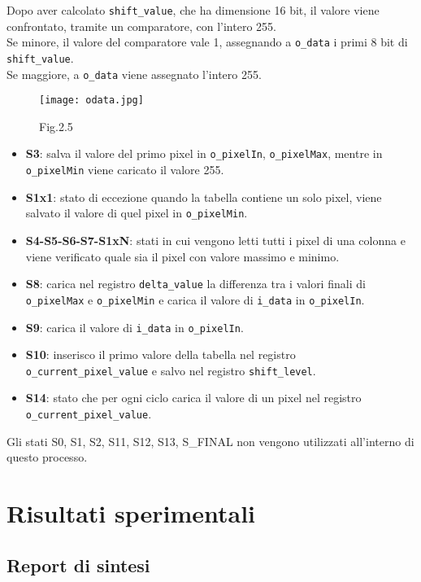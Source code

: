 \documentclass[12pt, table, xcdraw]{article}
\begin{document}
Dopo aver calcolato \texttt{shift\_value}, che ha dimensione 16 bit, il valore viene confrontato, tramite un comparatore, con l'intero 255. \\
Se minore, il valore del comparatore vale 1, assegnando a \texttt{o\_data} i primi 8 bit di \texttt{shift\_value}.\\
Se maggiore, a \texttt{o\_data} viene assegnato l'intero 255. \\

\begin{figure}[h!]
\begin{center}
  \texttt{[image: odata.jpg]}
  \caption*{Fig.2.5}
\end{center}
\end{figure}
\FloatBarrier

\begin{itemize}
\item \textbf{S3}: salva il valore del primo pixel in \texttt{o\_pixelIn}, \texttt{o\_pixelMax}, mentre in \texttt{o\_pixelMin} viene caricato il valore 255.
\item \textbf{S1x1}: stato di eccezione quando la tabella contiene un solo pixel, viene salvato il valore di quel pixel in \texttt{o\_pixelMin}.
\item \textbf{S4-S5-S6-S7-S1xN}: stati in cui vengono letti tutti i pixel di una colonna e viene verificato quale sia il pixel con valore massimo e minimo.
\item \textbf{S8}: carica nel registro \texttt{delta\_value} la differenza tra i valori finali di \texttt{o\_pixelMax} e \texttt{o\_pixelMin} e carica il valore di \texttt{i\_data} in \texttt{o\_pixelIn}.
\item \textbf{S9}: carica il valore di \texttt{i\_data} in \texttt{o\_pixelIn}.
\item \textbf{S10}: inserisco il primo valore della tabella nel registro \texttt{o\_current\_pixel\_value} e salvo nel registro \texttt{shift\_level}.
\item \textbf{S14}: stato che per ogni ciclo carica il valore di un pixel nel registro \texttt{o\_current\_pixel\_value}.
\end{itemize}
Gli stati S0, S1, S2, S11, S12, S13, S\_FINAL non vengono utilizzati all'interno di questo processo.
\newpage


\section{Risultati sperimentali}
\subsection{Report di sintesi}
\end{document}

